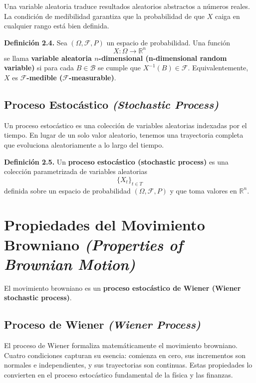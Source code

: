 \documentclass[12pt]{article}
\begin{document}
\begin{intuicion}
Una variable aleatoria traduce resultados aleatorios abstractos a n\'umeros reales. La condici\'on de medibilidad garantiza que la probabilidad de que $X$ caiga en cualquier rango est\'a bien definida.
\end{intuicion}

\textbf{Definici\'on 2.4.} Sea $(\Omega, \mathcal{F}, P)$ un espacio de probabilidad. Una funci\'on
\[
  X : \Omega \to \mathbb{R}^n
\]
se llama \textbf{variable aleatoria $n$-dimensional (n-dimensional random variable)} si para cada $B \in \mathcal{B}$ se cumple que $X^{-1}(B) \in \mathcal{F}$. Equivalentemente, $X$ es \textbf{$\mathcal{F}$-medible ($\mathcal{F}$-measurable)}.

\subsection{Proceso Estoc\'astico \textit{(Stochastic Process)}}

\begin{intuicion}
Un proceso estoc\'astico es una colecci\'on de variables aleatorias indexadas por el tiempo. En lugar de un solo valor aleatorio, tenemos una trayectoria completa que evoluciona aleatoriamente a lo largo del tiempo.
\end{intuicion}

\textbf{Definici\'on 2.5.} Un \textbf{proceso estoc\'astico (stochastic process)} es una colecci\'on parametrizada de variables aleatorias
\[
  \{X_t\}_{t \in T}
\]
definida sobre un espacio de probabilidad $(\Omega, \mathcal{F}, P)$ y que toma valores en $\mathbb{R}^n$.

\section{Propiedades del Movimiento Browniano
\textit{(Properties of Brownian Motion)}}

El movimiento browniano es un \textbf{proceso estoc\'astico de Wiener (Wiener stochastic process)}.

\subsection{Proceso de Wiener \textit{(Wiener Process)}}

\begin{intuicion}
El proceso de Wiener formaliza matem\'aticamente el movimiento browniano. Cuatro condiciones capturan su esencia: comienza en cero, sus incrementos son normales e independientes, y sus trayectorias son continuas. Estas propiedades lo convierten en el proceso estoc\'astico fundamental de la f\'isica y las finanzas.
\end{intuicion}
\end{document}
